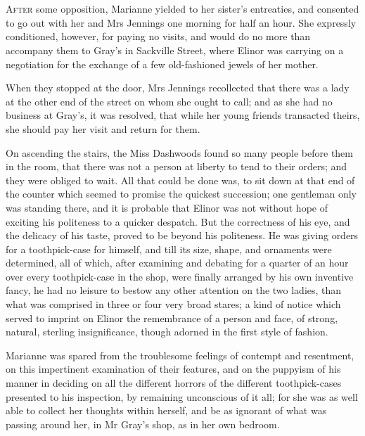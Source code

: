 \chapter[Chapter \thechapter]{}
\lettrine[lines=4,lraise=0.3]{A}{fter} some opposition, Marianne yielded to her sister’s entreaties, and consented to go out with her and Mrs Jennings one morning for half an hour. She expressly conditioned, however, for paying no visits, and would do no more than accompany them to Gray’s in Sackville Street, where Elinor was carrying on a negotiation for the exchange of a few old-fashioned jewels of her mother.

When they stopped at the door, Mrs Jennings recollected that there was a lady at the other end of the street on whom she ought to call; and as she had no business at Gray’s, it was resolved, that while her young friends transacted theirs, she should pay her visit and return for them.

On ascending the stairs, the Miss Dashwoods found so many people before them in the room, that there was not a person at liberty to tend to their orders; and they were obliged to wait. All that could be done was, to sit down at that end of the counter which seemed to promise the quickest succession; one gentleman only was standing there, and it is probable that Elinor was not without hope of exciting his politeness to a quicker despatch. But the correctness of his eye, and the delicacy of his taste, proved to be beyond his politeness. He was giving orders for a toothpick-case for himself, and till its size, shape, and ornaments were determined, all of which, after examining and debating for a quarter of an hour over every toothpick-case in the shop, were finally arranged by his own inventive fancy, he had no leisure to bestow any other attention on the two ladies, than what was comprised in three or four very broad stares; a kind of notice which served to imprint on Elinor the remembrance of a person and face, of strong, natural, sterling insignificance, though adorned in the first style of fashion.

Marianne was spared from the troublesome feelings of contempt and resentment, on this impertinent examination of their features, and on the puppyism of his manner in deciding on all the different horrors of the different toothpick-cases presented to his inspection, by remaining unconscious of it all; for she was as well able to collect her thoughts within herself, and be as ignorant of what was passing around her, in Mr Gray’s shop, as in her own bedroom.

